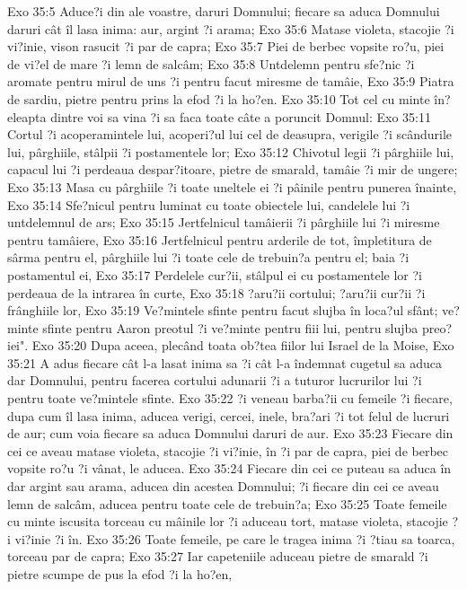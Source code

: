 Exo 35:5  Aduce?i din ale voastre, daruri Domnului; fiecare sa aduca Domnului daruri cât îl lasa inima: aur, argint ?i arama;
Exo 35:6  Matase violeta, stacojie ?i vi?inie, vison rasucit ?i par de capra;
Exo 35:7  Piei de berbec vopsite ro?u, piei de vi?el de mare ?i lemn de salcâm;
Exo 35:8  Untdelemn pentru sfe?nic ?i aromate pentru mirul de uns ?i pentru facut miresme de tamâie,
Exo 35:9  Piatra de sardiu, pietre pentru prins la efod ?i la ho?en.
Exo 35:10  Tot cel cu minte în?eleapta dintre voi sa vina ?i sa faca toate câte a poruncit Domnul:
Exo 35:11  Cortul ?i acoperamintele lui, acoperi?ul lui cel de deasupra, verigile ?i scândurile lui, pârghiile, stâlpii ?i postamentele lor;
Exo 35:12  Chivotul legii ?i pârghiile lui, capacul lui ?i perdeaua despar?itoare, pietre de smarald, tamâie ?i mir de ungere;
Exo 35:13  Masa cu pârghiile ?i toate uneltele ei ?i pâinile pentru punerea înainte,
Exo 35:14  Sfe?nicul pentru luminat cu toate obiectele lui, candelele lui ?i untdelemnul de ars;
Exo 35:15  Jertfelnicul tamâierii ?i pârghiile lui ?i miresme pentru tamâiere,
Exo 35:16  Jertfelnicul pentru arderile de tot, împletitura de sârma pentru el, pârghiile lui ?i toate cele de trebuin?a pentru el; baia ?i postamentul ei,
Exo 35:17  Perdelele cur?ii, stâlpul ei cu postamentele lor ?i perdeaua de la intrarea în curte,
Exo 35:18  ?aru?ii cortului; ?aru?ii cur?ii ?i frânghiile lor,
Exo 35:19  Ve?mintele sfinte pentru facut slujba în loca?ul sfânt; ve?minte sfinte pentru Aaron preotul ?i ve?minte pentru fiii lui, pentru slujba preo?iei".
Exo 35:20  Dupa aceea, plecând toata ob?tea fiilor lui Israel de la Moise,
Exo 35:21  A adus fiecare cât l-a lasat inima sa ?i cât l-a îndemnat cugetul sa aduca dar Domnului, pentru facerea cortului adunarii ?i a tuturor lucrurilor lui ?i pentru toate ve?mintele sfinte.
Exo 35:22  ?i veneau barba?ii cu femeile ?i fiecare, dupa cum îl lasa inima, aducea verigi, cercei, inele, bra?ari ?i tot felul de lucruri de aur; cum voia fiecare sa aduca Domnului daruri de aur.
Exo 35:23  Fiecare din cei ce aveau matase violeta, stacojie ?i vi?inie, în ?i par de capra, piei de berbec vopsite ro?u ?i vânat, le aducea.
Exo 35:24  Fiecare din cei ce puteau sa aduca în dar argint sau arama, aducea din acestea Domnului; ?i fiecare din cei ce aveau lemn de salcâm, aducea pentru toate cele de trebuin?a;
Exo 35:25  Toate femeile cu minte iscusita torceau cu mâinile lor ?i aduceau tort, matase violeta, stacojie ?i vi?inie ?i în.
Exo 35:26  Toate femeile, pe care le tragea inima ?i ?tiau sa toarca, torceau par de capra;
Exo 35:27  Iar capeteniile aduceau pietre de smarald ?i pietre scumpe de pus la efod ?i la ho?en,
